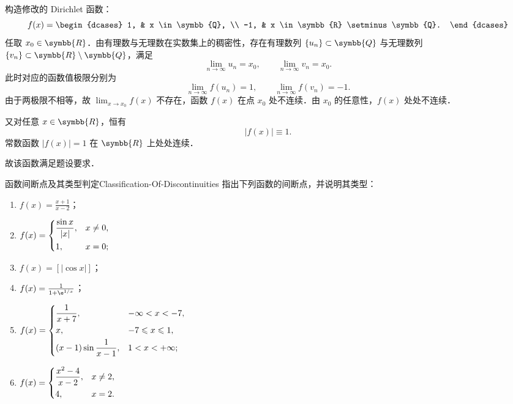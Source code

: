 \begin{myproof}
    构造修改的 Dirichlet 函数：
    \begin{equation}
        f(x) = \begin{dcases} 1, & x \in \symbb{Q}, \\ -1, & x \in \symbb{R} \setminus \symbb{Q}. \end{dcases}
    \end{equation}
    任取 $x_0 \in \symbb{R}$．由有理数与无理数在实数集上的稠密性，存在有理数列 $\{u_n\} \subset \symbb{Q}$ 与无理数列 $\{v_n\} \subset \symbb{R} \setminus \symbb{Q}$，满足
    \begin{equation}
        \lim_{n\to\infty} u_n = x_0, \qquad \lim_{n\to\infty} v_n = x_0.
    \end{equation}
    此时对应的函数值极限分别为
    \begin{equation}
        \lim_{n\to\infty} f(u_n) = 1, \qquad \lim_{n\to\infty} f(v_n) = -1.
    \end{equation}
    由于两极限不相等，故 $\lim_{x\to x_0} f(x)$ 不存在，函数 $f(x)$ 在点 $x_0$ 处不连续．由 $x_0$ 的任意性，$f(x)$ 处处不连续．

    又对任意 $x \in \symbb{R}$，恒有
    \begin{equation}
        |f(x)| \equiv 1.
    \end{equation}
    常数函数 $|f(x)| = 1$ 在 $\symbb{R}$ 上处处连续．

    故该函数满足题设要求．
\end{myproof}

\begin{problem}{函数间断点及其类型判定}{Classification-Of-Discontinuities}
    指出下列函数的间断点，并说明其类型：
    \begin{enumerate}
        \item $f(x) = \frac{x+1}{x-2}$；
        \item $f(x) = \begin{dcases} \frac{\sin x}{|x|}, & x \neq 0, \\ 1, & x = 0; \end{dcases}$
        \item $f(x) = [|\cos x|]$；
        \item $f(x) = \frac{1}{1 + \e^{1/x}}$；
        \item $f(x) = \begin{dcases} \frac{1}{x+7}, & -\infty < x < -7, \\ x, & -7 \leqslant x \leqslant 1, \\ (x-1)\sin\frac{1}{x-1}, & 1 < x < +\infty; \end{dcases}$
        \item $f(x) = \begin{dcases} \frac{x^2-4}{x-2}, & x \neq 2, \\ 4, & x = 2. \end{dcases}$
    \end{enumerate}
\end{problem}

